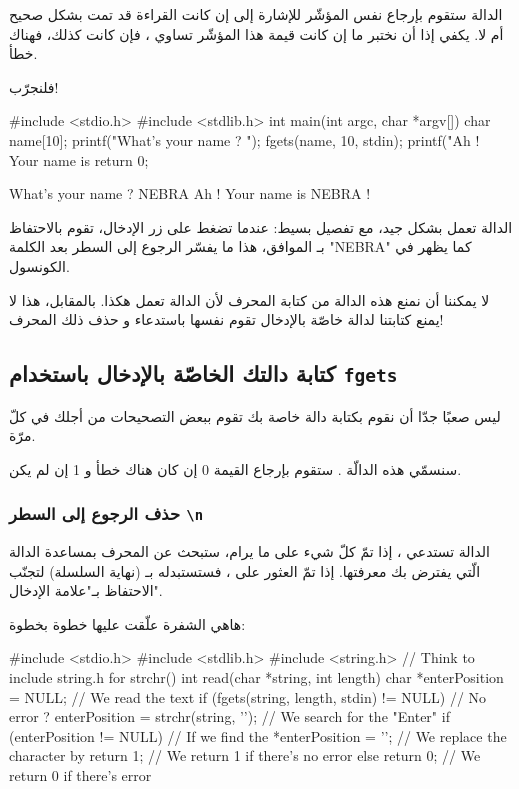 الدالة ستقوم بإرجاع نفس المؤشّر
للإشارة إلى إن كانت القراءة قد تمت بشكل صحيح أم لا. يكفي إذا أن نختبر ما إن كانت قيمة هذا المؤشّر تساوي
،
فإن كانت كذلك، فهناك خطأ.

فلنجرّب!

\begin{Csource}
#include <stdio.h>
#include <stdlib.h>
int main(int argc, char *argv[])
{
	char name[10];
	printf("What's your name ? ");
	fgets(name, 10, stdin);
	printf("Ah ! Your name is %
	return 0;
}
\end{Csource}

\begin{Console}
What's your name ? NEBRA
Ah ! Your name is NEBRA
!
\end{Console}

الدالة تعمل بشكل جيد، مع تفصيل بسيط: عندما تضغط على زر الإدخال، تقوم
بالاحتفاظ بـ
الموافق، هذا ما يفسّر الرجوع إلى السطر بعد الكلمة
"\textenglish{NEBRA}"
كما يظهر في الكونسول.

لا يمكننا أن نمنع هذه الدالة من كتابة المحرف
لأن الدالة تعمل هكذا. بالمقابل، هذا لا يمنع كتابتنا لدالة خاصّة بالإدخال تقوم نفسها باستدعاء
و حذف ذلك المحرف!

\subsection{كتابة دالتك الخاصّة بالإدخال باستخدام \texttt{fgets}}

ليس صعبًا جدّا أن نقوم بكتابة دالة خاصة بك تقوم ببعض التصحيحات من أجلك في كلّ مرّة.

سنسمّي هذه الدالّة
.
ستقوم بإرجاع القيمة 0 إن كان هناك خطأ و 1 إن لم يكن.

\subsubsection{حذف الرجوع إلى السطر \texttt{\textbackslash n}}

الدالة
تستدعي
،
إذا تمّ كلّ شيء على ما يرام، ستبحث عن المحرف
بمساعدة الدالة
الّتي يفترض بك معرفتها. إذا تمّ العثور على
،
فستستبدله بـ
(نهاية السلسلة) لتجنّب الاحتفاظ بـ"علامة الإدخال".

هاهي الشفرة علّقت عليها خطوة بخطوة:

\begin{Csource}
#include <stdio.h>
#include <stdlib.h>
#include <string.h> // Think to include string.h for strchr()
int read(char *string, int length)
{
	char *enterPosition = NULL;
	// We read the text
	if (fgets(string, length, stdin) != NULL)  // No error ?
	{
    		enterPosition = strchr(string, '\n'); // We search for the "Enter"
    		if (enterPosition != NULL) // If we find the \n
    		{
        			*enterPosition = '\0'; // We replace the character by \0
    		}
    		return 1; // We return 1 if there's no error
	}
	else
	 {
    		return 0; // We return 0 if there's error
	 }
}
\end{Csource}

